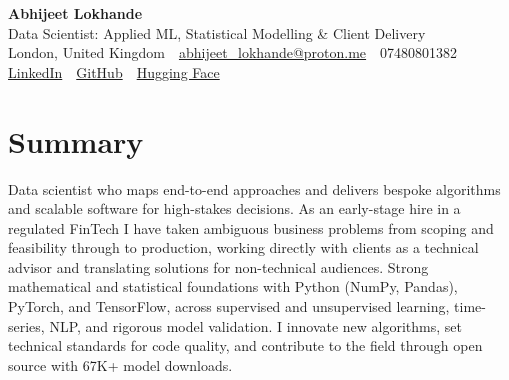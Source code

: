 \documentclass[10pt,a4paper]{article}
\newcommand{\sep}{\,\textcolor{accent!60}{\textbar}\,}
\begin{document}
\begin{center}
  {\fontsize{24}{26}\selectfont\bfseries Abhijeet Lokhande}\\[2pt]
  {\color{accent}\large Data Scientist: Applied ML, Statistical Modelling \& Client Delivery}\\[4pt]
  {\small
    London, United Kingdom \sep
    \href{mailto:abhijeet_lokhande@proton.me}{abhijeet\_lokhande@proton.me} \sep
    07480801382 \\[2pt]
    \href{https://www.linkedin.com/in/ablds/}{LinkedIn} \sep
    \href{https://github.com/abhijeetscode}{GitHub} \sep
    \href{https://huggingface.co/ab-ai}{Hugging Face}
  }
\end{center}

\section{Summary}
Data scientist who maps end-to-end approaches and delivers bespoke algorithms and scalable software for high-stakes decisions. As an early-stage hire in a regulated FinTech I have taken ambiguous business problems from scoping and feasibility through to production, working directly with clients as a technical advisor and translating solutions for non-technical audiences. Strong mathematical and statistical foundations with Python (NumPy, Pandas), PyTorch, and TensorFlow, across supervised and unsupervised learning, time-series, NLP, and rigorous model validation. I innovate new algorithms, set technical standards for code quality, and contribute to the field through open source with 67K+ model downloads.

\end{document}
